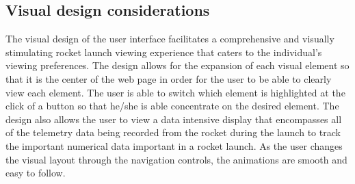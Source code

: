 \subsection{Visual design considerations}
  The visual design of the user interface facilitates a comprehensive and 
  visually stimulating rocket launch viewing experience that caters to the 
  individual's viewing preferences. The design allows for the expansion of
  each visual element so that it is the center of the web page in order for the
  user to be able to clearly view each element. The user is able to switch 
  which element is highlighted at the click of a button so that he/she is able
  concentrate on the desired element. The design also allows the user to view 
  a data intensive display that encompasses all of the telemetry data being recorded 
  from the rocket during the launch to track the important numerical data important 
  in a rocket launch. As the user changes the visual layout through the navigation 
  controls, the animations are smooth and easy to follow.
  
  